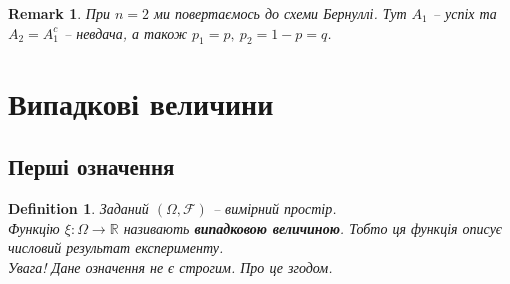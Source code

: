 \documentclass[a4paper, 10pt]{article}
\theoremstyle{theoremdd}
\newtheorem{definition}[theorem]{Definition}
\newtheorem{remark}[theorem]{Remark}
\begin{document}
\begin{remark}
При $n = 2$ ми повертаємось до схеми Бернуллі. Тут $A_1$ -- успіх та $A_2 = A_1^c$ -- невдача, а також $p_1 = p,\ p_2 = 1-p=q$.
\end{remark}
\newpage

\section{Випадкові величини}
\subsection{Перші означення}
\begin{definition}
Заданий $(\Omega,\mathcal{F})$ -- вимірний простір.\\
Функцію $\xi \colon \Omega \to \mathbb{R}$ називають \textbf{випадковою величиною}. Тобто ця функція описує числовий результат експерименту.\\
\textit{Увага! Дане означення не є строгим. Про це згодом.}
\end{definition}

\iffalse
\begin{definition}
Заданий $(\Omega,\mathcal{F})$ -- вимірний простір, також розглянемо $(\mathbb{R}, \mathcal{B}(\mathbb{R}))$.\\
Функція $\xi \colon \Omega \to \mathbb{R}$ називається \textbf{випадковою величиною}, якщо
\begin{align*}
\xi \text{ -- $\mathcal{F}$-вимірна функція.}
\end{align*}
\end{definition}
\noindent
Оскільки $\xi$ -- $\mathcal{F}$-вимірна функція, то це (із курсу теорії міри) дозволяє сказати нам, що $\{\xi < a\} \in \mathcal{F},\ \{\xi \leq a \} \in \mathcal{F},\ \{\xi \geq a\} \in \mathcal{F},\ \{\xi > a \} \in \mathcal{F}$ для будь-якого $a \in \mathbb{R}$. Таке означення зумовлено тим, щоб ми мали змогу обчислювати (наприклад) $\mathbb{P}\{\xi \in [a,b]\}$.
\fi
\end{document}
